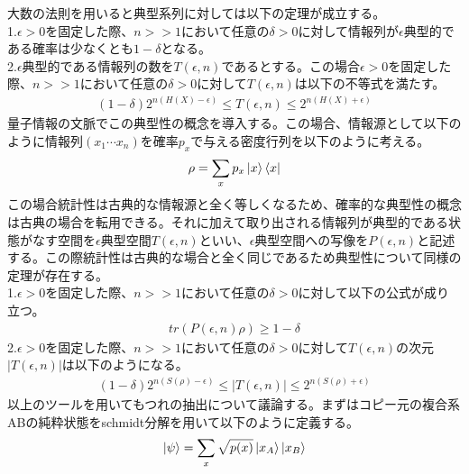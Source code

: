 \documentclass[a4paper,10.5pt]{article}
\numberwithin{equation}{section}
\begin{document}
大数の法則を用いると典型系列に対しては以下の定理が成立する。\\
1.$\epsilon>0$を固定した際、$n>>1$において任意の$\delta>0$に対して情報列が$\epsilon$典型的である確率は少なくとも$1-\delta$となる。\\
2.$\epsilon$典型的である情報列の数を$T(\epsilon,n)$であるとする。この場合$\epsilon>0$を固定した際、$n>>1$において任意の$\delta>0$に対して$T(\epsilon,n)$は以下の不等式を満たす。
\begin{equation}\begin{split}
    (1-\delta)2^{n(H(X)-\epsilon)}\leq T(\epsilon,n) \leq 2^{n(H(X)+\epsilon)}
\end{split} \end{equation}
量子情報の文脈でこの典型性の概念を導入する。この場合、情報源として以下のように情報列$(x_{1}\cdots x_{n})$を確率$p_{x}$で与える密度行列を以下のように考える。
\begin{equation}\begin{split}
    \rho = \sum_{x} p_{x} \ket{x}\bra{x}
\end{split} \end{equation}
この場合統計性は古典的な情報源と全く等しくなるため、確率的な典型性の概念は古典の場合を転用できる。それに加えて取り出される情報列が典型的である状態がなす空間を$\epsilon$典型空間$T(\epsilon,n)$といい、$\epsilon$典型空間への写像を$P(\epsilon,n)$と記述する。この際統計性は古典的な場合と全く同じであるため典型性について同様の定理が存在する。\\
1.$\epsilon>0$を固定した際、$n>>1$において任意の$\delta>0$に対して以下の公式が成り立つ。
\begin{equation}\begin{split}
    tr(P(\epsilon,n)\rho) \geq 1- \delta
\end{split} \end{equation}
2.$\epsilon>0$を固定した際、$n>>1$において任意の$\delta>0$に対して$T(\epsilon,n)$の次元$|T(\epsilon,n)|$は以下のようになる。
\begin{equation}\begin{split}
     (1-\delta)2^{n(S(\rho)-\epsilon)}\leq |T(\epsilon,n)| \leq 2^{n(S(\rho)+\epsilon)}
\end{split} \end{equation}
以上のツールを用いてもつれの抽出について議論する。まずはコピー元の複合系ABの純粋状態をschmidt分解を用いて以下のように定義する。
\begin{equation}\begin{split}
    \ket{\psi}=\sum_{x}\sqrt{p(x)}\ket{x_{A}}\ket{x_{B}}
\end{split} \end{equation}
\end{document}
